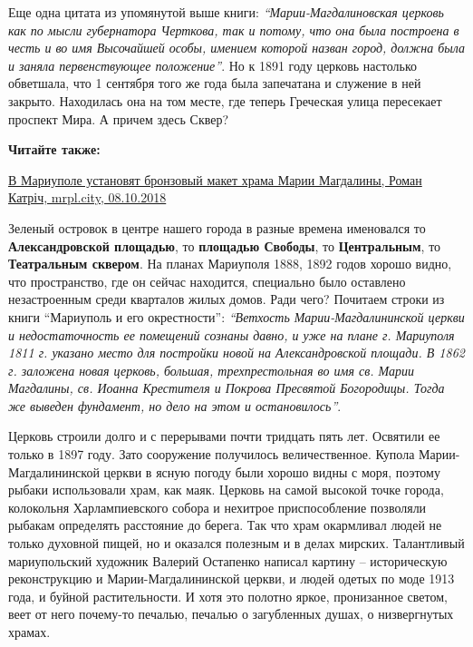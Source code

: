 Еще одна цитата из упомянутой  выше книги: \emph{\enquote{Марии-Магдалиновская церковь как по
мысли губернатора Черткова, так и потому, что она была построена в честь и во
имя Высочайшей особы, имением которой назван город, должна была и заняла
первенствующее положение}}. Но к 1891 году церковь настолько обветшала, что 1
сентября того же года была запечатана и служение в ней закрыто. Находилась она
на том месте, где теперь Греческая улица пересекает проспект Мира. А причем
здесь Сквер?

\textbf{Читайте также:} 

\href{https://mrpl.city/news/view/v-mariupole-ustanovyat-bronzovyj-maket-hrama-marii-magdaliny-foto}{%
В Мариуполе установят бронзовый макет храма Марии Магдалины, Роман Катріч, mrpl.city, 08.10.2018}


Зеленый островок в центре нашего города в разные времена именовался то
\textbf{Александровской площадью}, то \textbf{площадью Свободы}, то \textbf{Центральным}, то \textbf{Театральным
сквером}. На планах Мариуполя 1888, 1892 годов хорошо видно, что пространство,
где он сейчас находится, специально было оставлено незастроенным среди
кварталов жилых домов. Ради чего? Почитаем строки из  книги \enquote{Мариуполь и его
окрестности}: \emph{\enquote{Ветхость Марии-Магдалининской церкви и недостаточность ее
помещений сознаны давно, и уже на плане г. Мариуполя 1811 г. указано место для
постройки новой на Александровской площади. В 1862 г. заложена новая церковь,
большая, трехпрестольная во имя св. Марии Магдалины, св. Иоанна Крестителя и
Покрова Пресвятой Богородицы. Тогда же выведен фундамент, но дело на этом и
остановилось}}.


Церковь строили долго и с перерывами почти тридцать пять лет. Освятили ее
только в 1897 году. Зато сооружение получилось величественное. Купола
Марии-Магдалининской церкви в ясную погоду были хорошо видны с моря, поэтому
рыбаки использовали храм, как маяк.  Церковь на самой высокой точке города,
колокольня Харлампиевского собора и нехитрое приспособление позволяли рыбакам
определять расстояние до берега. Так что храм окармливал людей не только
духовной пищей, но и оказался полезным и в делах мирских. Талантливый
мариупольский художник Валерий Остапенко написал картину – историческую
реконструкцию и Марии-Магдалининской церкви, и людей одетых по моде 1913 года,
и буйной растительности. И хотя это полотно яркое, пронизанное светом, веет от
него почему-то  печалью, печалью о загубленных душах, о низвергнутых храмах.

